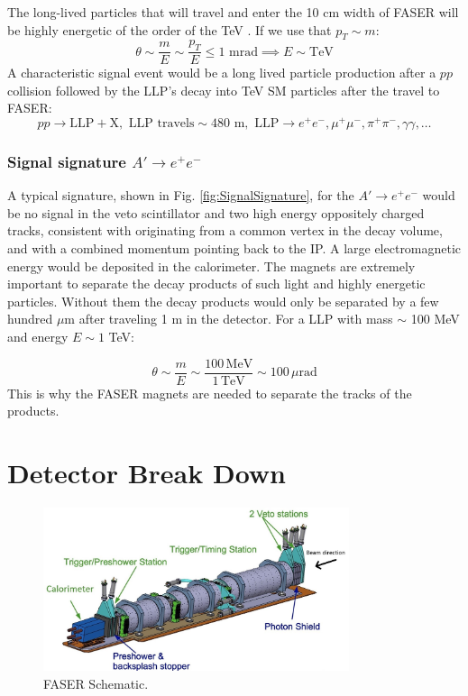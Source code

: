 The long-lived particles that will travel and enter the 10 cm width of FASER will be highly energetic of the order of the TeV \cite{faser_collaboration_faser:_2019}. If we use that $p_{T}\sim m$:
\[ \theta\sim \frac{m}{E}\sim\frac{p_{T}}{E}\leq 1 \text{ mrad} \implies E\sim \text{TeV}\]
A characteristic signal event would be a long lived particle production after a $pp$ collision followed by the LLP's decay into TeV SM particles after the travel to FASER:
\[ pp \rightarrow \text{LLP} + \text{X}, \text{ LLP travels} \sim \text{480 m}, \text{ LLP} \rightarrow e^{+}e^{-}, \mu^{+}\mu^{-}, \pi^{+}\pi^{-},\gamma\gamma,\dots \]

\subsubsection{Signal signature $A'\rightarrow e^{+}e^{-}$}

A typical signature, shown in Fig. \ref{fig:SignalSignature}, for the $A'\rightarrow e^{+}e^{-}$ would be no signal in the veto scintillator and two high energy oppositely charged tracks, consistent with originating from a common vertex in the decay volume, and with a combined momentum pointing back to the IP. A large electromagnetic energy would be deposited in the calorimeter. The magnets are extremely important to separate the decay products of such light and highly energetic particles. Without them the decay products would only be separated by a few hundred $\mu$m after traveling 1 m in the detector. For a LLP with mass $\sim$ 100 MeV and energy $E\sim1$ TeV:

\[ \theta\sim\frac{m}{E}\sim\frac{100\,\text{MeV}}{1\,\text{TeV}}\sim100\,\mu\text{rad} \]
This is why the FASER magnets are needed to separate the tracks of the products.

\section{Detector Break Down}

\begin{figure}[htbp!] 
\centering    
\includegraphics[width=0.8\textwidth]{ChapterFaser/Figs/Raster/FaserSchema.jpg}  
\caption{FASER Schematic.}
\label{fig:FaserSchematic}
\end{figure}

